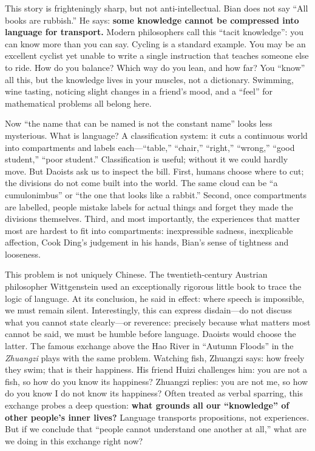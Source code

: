 This story is frighteningly sharp, but not anti-intellectual. Bian does not say ``All books are rubbish.'' He says: \textbf{some knowledge cannot be compressed into language for transport.} Modern philosophers call this ``tacit knowledge'': you can know more than you can say. Cycling is a standard example. You may be an excellent cyclist yet unable to write a single instruction that teaches someone else to ride. How do you balance? Which way do you lean, and how far? You ``know'' all this, but the knowledge lives in your muscles, not a dictionary. Swimming, wine tasting, noticing slight changes in a friend's mood, and a ``feel'' for mathematical problems all belong here.

Now ``the name that can be named is not the constant name'' looks less mysterious. What is language? A classification system: it cuts a continuous world into compartments and labels each---``table,'' ``chair,'' ``right,'' ``wrong,'' ``good student,'' ``poor student.'' Classification is useful; without it we could hardly move. But Daoists ask us to inspect the bill. First, humans choose where to cut; the divisions do not come built into the world. The same cloud can be ``a cumulonimbus'' or ``the one that looks like a rabbit.'' Second, once compartments are labelled, people mistake labels for actual things and forget they made the divisions themselves. Third, and most importantly, the experiences that matter most are hardest to fit into compartments: inexpressible sadness, inexplicable affection, Cook Ding's judgement in his hands, Bian's sense of tightness and looseness.

This problem is not uniquely Chinese. The twentieth-century Austrian philosopher Wittgenstein used an exceptionally rigorous little book to trace the logic of language. At its conclusion, he said in effect: where speech is impossible, we must remain silent. Interestingly, this can express disdain---do not discuss what you cannot state clearly---or reverence: precisely because what matters most cannot be said, we must be humble before language. Daoists would choose the latter. The famous exchange above the Hao River in ``Autumn Floods'' in the \textit{Zhuangzi} plays with the same problem. Watching fish, Zhuangzi says: how freely they swim; that is their happiness. His friend Huizi challenges him: you are not a fish, so how do you know its happiness? Zhuangzi replies: you are not me, so how do you know I do not know its happiness? Often treated as verbal sparring, this exchange probes a deep question: \textbf{what grounds all our ``knowledge'' of other people's inner lives?} Language transports propositions, not experiences. But if we conclude that ``people cannot understand one another at all,'' what are we doing in this exchange right now?

